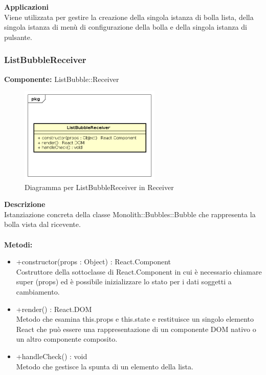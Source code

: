 \textbf{Applicazioni}\\
Viene utilizzata per gestire la creazione della singola istanza di bolla lista, della singola istanza di menù di configurazione della bolla e della singola istanza di pulsante. 


\clearpage

\subsubsection{ListBubbleReceiver}
\textbf{Componente:}  ListBubble::Receiver\\
   \FloatBarrier
   \begin{figure}[ht]
   \centering
   \includegraphics[width=0.6\textwidth]{img/single-ListBubbleReceiver}
   \caption{{Diagramma per ListBubbleReceiver in Receiver}}
\end{figure}
\FloatBarrier
\textbf{Descrizione}\\
Istanziazione concreta della classe Monolith::Bubbles::Bubble che rappresenta la bolla vista dal ricevente.
\\
\\
\textbf{Metodi:} 
\begin{itemize}
\item +constructor(props : Object) : React.Component 
\\
Costruttore della sottoclasse di React.Component in cui è necessario chiamare super (props) ed è possibile inizializzare lo stato per i dati soggetti a cambiamento.

\item +render() : React.DOM 
\\
Metodo che esamina this.props e this.state e restituisce un singolo elemento React che può essere una rappresentazione di un componente DOM nativo o un altro componente composito.

\item +handleCheck() : void 
\\
Metodo che gestisce la spunta di un elemento della lista.
\end{itemize} 


